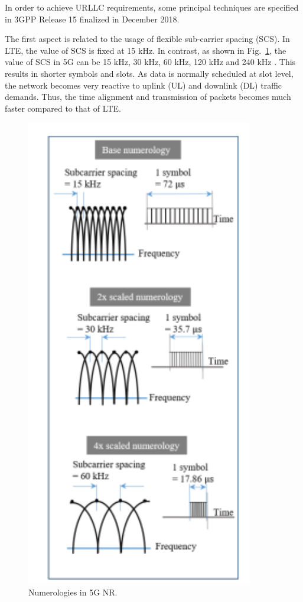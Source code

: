 \documentclass{report}
\begin{document}
In order to achieve URLLC requirements, some principal techniques are specified in 3GPP Release 15 finalized in December 2018.

The first aspect is related to the usage of flexible sub-carrier spacing (SCS). In LTE, the value of SCS is fixed at 15 kHz. In contrast, as shown in Fig.~\ref{fig32},  the value of SCS in 5G can be 15 kHz, 30 kHz, 60 kHz, 120 kHz and 240 kHz \cite{ad6}. This results in shorter symbols and slots. As data is normally scheduled at slot level, the network becomes very reactive to uplink (UL) and downlink (DL) traffic demands. Thus, the time alignment and transmission of packets becomes much faster compared to that of LTE.

\begin{figure}[htbp]
\centerline{\includegraphics[scale=0.35]{fig32.png}}
\caption{Numerologies in 5G NR.}
\label{fig32}
\end{figure}
\end{document}
